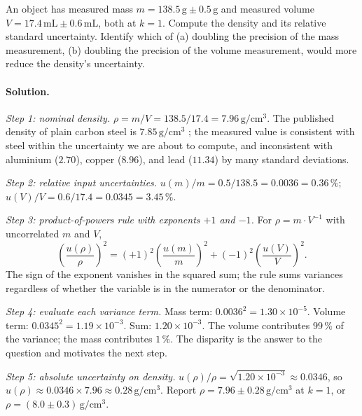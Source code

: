 \begin{exercise}
An object has measured mass $m = 138.5 \,\si{\gram} \pm 0.5 \,\si
{\gram}$ and measured volume $V = 17.4 \,\si{\milli\liter} \pm
0.6 \,\si{\milli\liter}$, both at $k = 1$. Compute the density and
its relative standard uncertainty. Identify which of (a) doubling
the precision of the mass measurement, (b) doubling the precision of
the volume measurement, would more reduce the density's
uncertainty.
\end{exercise}

\paragraph{Solution.}

\emph{Step 1: nominal density.}
$\rho = m / V = 138.5 / 17.4 = 7.96 \,\si{\gram\per\centi\meter
\cubed}$. The published density of plain carbon steel is
$7.85 \,\si{\gram\per\centi\meter\cubed}$
\cite{text:ashby2017}; the measured value is consistent with steel
within the uncertainty we are about to compute, and inconsistent
with aluminium ($2.70$), copper ($8.96$), and lead ($11.34$) by
many standard deviations.

\emph{Step 2: relative input uncertainties.}
$u(m)/m = 0.5 / 138.5 = 0.0036 = 0.36\,\%$;
$u(V)/V = 0.6 / 17.4 = 0.0345 = 3.45\,\%$.

\emph{Step 3: product-of-powers rule with exponents $+1$ and $-1$.}
For $\rho = m \cdot V^{-1}$ with uncorrelated $m$ and $V$,
\[
\left(\frac{u(\rho)}{\rho}\right)^{2} = (+1)^{2}
\left(\frac{u(m)}{m}\right)^{2} + (-1)^{2}
\left(\frac{u(V)}{V}\right)^{2}.
\]
The sign of the exponent vanishes in the squared sum; the rule
sums variances regardless of whether the variable is in the
numerator or the denominator.

\emph{Step 4: evaluate each variance term.}
Mass term: $0.0036^{2} = 1.30 \times 10^{-5}$.
Volume term: $0.0345^{2} = 1.19 \times 10^{-3}$.
Sum: $1.20 \times 10^{-3}$. The volume contributes
$99\,\%$ of the variance; the mass contributes $1\,\%$. The
disparity is the answer to the question and motivates the next
step.

\emph{Step 5: absolute uncertainty on density.}
$u(\rho)/\rho = \sqrt{1.20 \times 10^{-3}} \approx 0.0346$, so
$u(\rho) \approx 0.0346 \times 7.96 \approx 0.28 \,\si{\gram\per
\centi\meter\cubed}$. Report $\rho = 7.96 \pm 0.28 \,\si{\gram\per
\centi\meter\cubed}$ at $k = 1$, or $\rho = (8.0 \pm 0.3) \,\si
{\gram\per\centi\meter\cubed}$.

